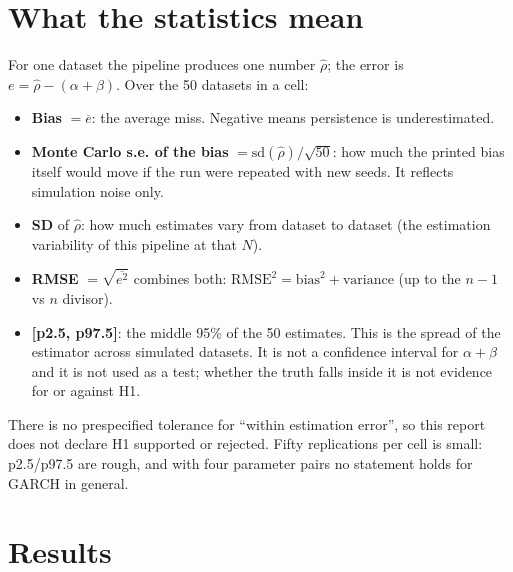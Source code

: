\documentclass[11pt]{article}
\newcommand{\rhohat}{\hat\rho}
\begin{document}
\section{What the statistics mean}
For one dataset the pipeline produces one number $\rhohat$; the error is $e=\rhohat-(\alpha+\beta)$. Over the 50 datasets in a cell:
\begin{itemize}
\item \textbf{Bias} $=\overline{e}$: the average miss. Negative means persistence is underestimated.
\item \textbf{Monte Carlo s.e. of the bias} $=\mathrm{sd}(\rhohat)/\sqrt{50}$: how much the printed bias itself would move if the run were repeated with new seeds. It reflects simulation noise only.
\item \textbf{SD} of $\rhohat$: how much estimates vary from dataset to dataset (the estimation variability of this pipeline at that $N$).
\item \textbf{RMSE} $=\sqrt{\overline{e^2}}$ combines both: $\mathrm{RMSE}^2=\mathrm{bias}^2+\mathrm{variance}$ (up to the $n-1$ vs $n$ divisor).
\item \textbf{[p2.5, p97.5]}: the middle 95\% of the 50 estimates. This is the spread of the estimator across simulated datasets. It is not a confidence interval for $\alpha+\beta$ and it is not used as a test; whether the truth falls inside it is not evidence for or against H1.
\end{itemize}
There is no prespecified tolerance for ``within estimation error'', so this report does not declare H1 supported or rejected. Fifty replications per cell is small: p2.5/p97.5 are rough, and with four parameter pairs no statement holds for GARCH in general.

\section{Results}
\end{document}
